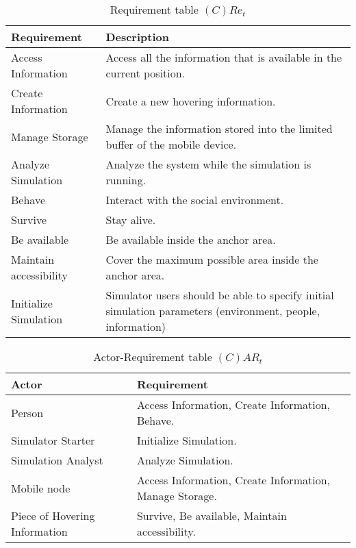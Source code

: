 \begin{table}[H]
	\centering
	\begin{tabular}{|p{4cm}|p{8cm}|}
			\hline
			\textbf{Requirement} & \textbf{Description} \\
			\hline
			Access Information & Access all the information that is available in the
			current position. \\
			\hline
			Create Information & Create a new hovering information. \\
			\hline
			Manage Storage & Manage the information stored into the limited buffer
			of the mobile device.  \\
			\hline
			Analyze Simulation & Analyze the system while the simulation is running.
			\\
			\hline
			Behave & Interact with the social environment. \\
			\hline
			Survive & Stay alive. \\
			\hline
			Be available & Be available inside the anchor area. \\
			\hline
			Maintain accessibility & Cover the maximum possible area inside the
			anchor area. \\
			\hline
			Initialize Simulation & Simulator users should be able to specify
			initial simulation parameters (environment, people, information) \\
			\hline
		\end{tabular}
	\caption{Requirement table $(C)Re_t$}
	\label{tab:cact}
\end{table}

\begin{table}[H]
	\centering
	\begin{tabular}{|p{4cm}|p{8cm}|}
			\hline
			\textbf{Actor} & \textbf{Requirement} \\
			\hline
			Person & Access Information, Create Information, Behave. \\
			\hline
			Simulator Starter & Initialize Simulation. \\
			\hline
			Simulation Analyst & Analyze Simulation. \\
			\hline
			Mobile node & Access Information, Create Information, Manage Storage. \\
			\hline
			Piece of Hovering Information & Survive, Be available, Maintain
			accessibility. \\
			\hline
		\end{tabular}
	\caption{Actor-Requirement table $(C)AR_t$}
	\label{tab:cart}
\end{table}

